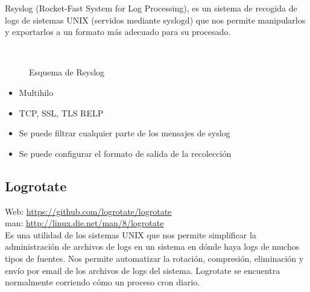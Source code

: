 Rsyslog (Rocket-Fast System for Log Processing), es un sistema de recogida de logs de sistemas UNIX (servidos mediante syslogd) que nos permite manipularlos y exportarlos a un formato más adecuado para su procesado.\\
\begin{figure}[H]
  \\
  \caption{Esquema de Rsyslog}
\end{figure}

\begin{itemize}
\item Multihilo
\item TCP, SSL, TLS RELP
\item Se puede filtrar cualquier parte de los mensajes de syslog
\item Se puede configurar el formato de salida de la recolección
\end{itemize}

\subsection{Logrotate}

Web: \url{https://github.com/logrotate/logrotate}\\
man: \url{http://linux.die.net/man/8/logrotate}\\

Es una utilidad de los sistemas UNIX que nos permite simplificar la administración de archivos de logs en un sistema en dónde haya logs de muchos tipos de fuentes. Nos permite automatizar la rotación, compresión, eliminación y envío por email de los archivos de logs del sistema. Logrotate se encuentra normalmente corriendo cómo un proceso cron diario. \\

